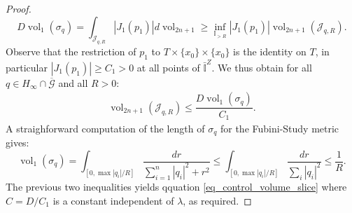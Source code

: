 \documentclass[12pt]{amsbook}%
\theoremstyle{definition}
\theoremstyle{remark}
\numberwithin{section}{chapter}
\numberwithin{subsection}{section}
\numberwithin{figure}{chapter}
\DeclareMathOperator{\vol}{vol}
\begin{document}
{{\begin{proof}
   $$
  D \vol_1(\sigma_q)  =   \int_{\mathcal{J}_{q,R}} |J_1(p_1)| d\vol_{2n+1}  \geqslant \inf_{\mathbb{I}_{>R}} |J_1(p_1)| \vol_{2n+1}(\mathcal{J}_{q,R}). 
$$
    Observe that the restriction of $p_1$ to  $T \times \{ x_0\}\times \{ x_0\}$ is the identity on $T$, in particular $|J_1(p_1)| \geqslant C_1>0$ at all points of $\bar{\mathbb{I}}^Z$. 
    We thus obtain for all $q \in H_{\infty} \cap \overline{\mathcal{G}}$ and all $R> 0$: 
    \begin{align*}
    \vol_{2n+1} (\mathcal{J}_{q,R}) \leqslant \dfrac{D \vol_1(\sigma_q)}{C_1}.
\end{align*}     
A straighforward computation of the length of $\sigma_q$ for the Fubini-Study metric gives: 
\begin{equation*}
\vol_1(\sigma_q) = \int_{[0,\max |q_i|/R]} \dfrac{dr}{\sum_{i=1}^n |q_i|^2 + r^2} \leqslant \int_{[0,\max |q_i|/R]} \dfrac{dr}{\sum_i |q_i|^2} \leqslant \dfrac{1}{R}.
\end{equation*}
The previous two inequalities yields qquation \eqref{eq_control_volume_slice} where $C = D/C_1$ is a constant independent of $\lambda$, as required. 

\medskip


\end{proof}}}
\end{document}
